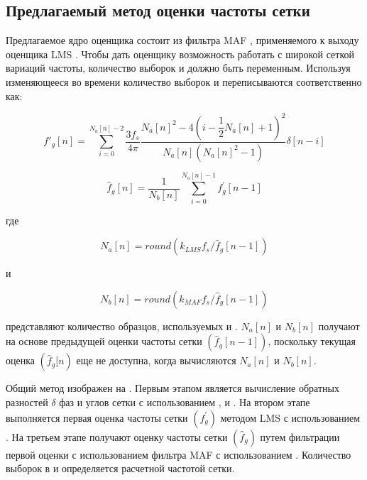 \subsection{Предлагаемый метод оценки частоты сетки} \label{sec:ch2/sec1_3}
Предлагаемое ядро оценщика состоит из фильтра MAF , применяемого к выходу оценщика LMS . Чтобы дать оценщику возможность работать с широкой сеткой вариаций частоты, количество выборок  и  должно быть переменным. Используя изменяющееся во времени количество выборок  и  переписываются соответственно как:

\begin{equation}\label{eq:equation126}
f\prime_g[n]= \sum\limits_{i=0}^{N_a[n]-2} \dfrac{3f_s}{4\pi} \dfrac{N_a[n]^2-4(i-\dfrac{1}{2} N_a[n]+1)^2}{N_a[n](N_a[n]^2-1)} \delta [n-i]
\end{equation}

\begin{equation}\label{eq:equation127}
\hat{f}_g[n] =\dfrac{1}{N_b[n]}  \sum\limits_{i=0}^{N_a[n]-1} f^\prime_g[n-1]
\end{equation}

где 

\begin{equation}\label{eq:equation128}
N_a[n] = round(k_{LMS} f_s / \hat{f}_g[n-1])
\end{equation}

и

\begin{equation}\label{eq:equation129}
N_b[n] = round(k_{MAF} f_s / \hat{f}_g[n-1])
\end{equation}

представляют количество образцов, используемых  и . $ N_a[n] $ и $ N_b[n] $ получают на основе предыдущей оценки частоты сетки $ ({\hat{f}}_g[n-1]) $, поскольку текущая оценка $ ({\hat{f}}_g[n) $ еще не доступна, когда вычисляются $ N_a[n] $ и $ N_b[n] $.

Общий метод изображен на . Первым этапом является вычисление обратных разностей $ \delta $ фаз и углов сетки с использованием ,  и . На втором этапе выполняется первая оценка частоты сетки $ (f_g^\prime) $ методом LMS с использованием . На третьем этапе получают оценку частоты сетки $ ({\hat{f}}_g) $ путем фильтрации первой оценки с использованием фильтра MAF с использованием . Количество выборок в  и  определяется расчетной частотой сетки.

